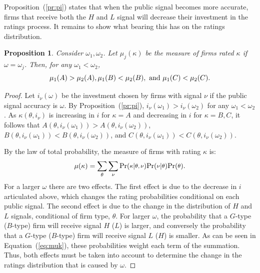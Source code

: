 \documentclass[titlepage]{article}
\newtheorem{proposition}{Proposition}
\begin{document}
Proposition~(\ref{pr:pi}) states that when the public signal becomes more accurate, firms that receive both the $H$ and $L$ signal will decrease their investment in the ratings process. It remains to show what bearing this has on the ratings distribution. 

\begin{proposition}
Consider $\omega_{1},\omega_{2}$. Let $\mu_{j}(\kappa)$ be the measure of firms rated $\kappa$ if $\omega=\omega_{j}$. Then, for any $\omega_{1}<\omega_{2}$,
\begin{equation*}
\mu_{1}(A)>\mu_{2}(A), \mu_{1}(B)<\mu_{2}(B), \textup{ and } \mu_{1}(C)<\mu_{2}(C).
\end{equation*}
\end{proposition}
\begin{proof}
Let $i_{\nu}(\omega)$ be the investment chosen by firms with signal $\nu$ if the public signal accuracy is $\omega$. By Proposition~(\ref{pr:pi}), $i_{\nu}(\omega_{1})>i_{\nu}(\omega_{2})$ for any $\omega_{1}<\omega_{2}$. As $\kappa(\theta,i_{\nu})$ is increasing in $i$ for $\kappa=A$ and decreasing in $i$ for $\kappa=B,C$, it follows that $A(\theta,i_{\nu}(\omega_{1}))>A(\theta,i_{\nu}(\omega_{2}))$, $B(\theta,i_{\nu}(\omega_{1}))<B(\theta,i_{\nu}(\omega_{2}))$, and $C(\theta,i_{\nu}(\omega_{1}))<C(\theta,i_{\nu}(\omega_{2}))$.

By the law of total probability, the measure of firms with rating $\kappa$ is:
\begin{equation}
\label{eq:muk}%
\mu(\kappa) = \sum_{\theta}\sum_{\nu}\textup{Pr}(\medmath{\kappa}|\medmath{\theta,\nu})\textup{Pr}(\medmath{\nu}|\medmath{\theta})\textup{Pr}(\medmath{\theta}).
\end{equation}
For a larger $\omega$ there are two effects. The first effect is due to the decrease in $i$ articulated above, which changes the rating probabilities conditional on each public signal. The second effect is due to the change in the distribution of $H$ and $L$ signals, conditional of firm type, $\theta$. For larger $\omega$, the probability that a $G$-type ($B$-type) firm will receive signal $H$ ($L$) is larger, and conversely the probability that a $G$-type ($B$-type) firm will receive signal $L$ ($H$) is smaller. As can be seen in Equation~(\ref{eq:muk}), these probabilities weight each term of the summation. Thus, both effects must be taken into account to determine the change in the ratings distribution that is caused by $\omega$.


\end{proof}
\end{document}
